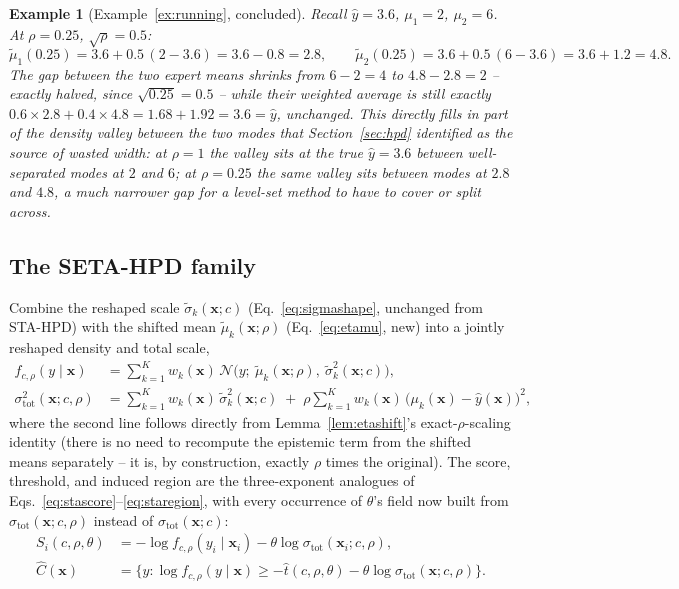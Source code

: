 \documentclass[11pt]{article}
\newtheorem{example}{Example}[section]
\begin{document}
\begin{example}[Example~\ref{ex:running}, concluded]
Recall $\hat y=3.6$, $\mu_1=2$, $\mu_2=6$. At $\rho=0.25$, $\sqrt\rho=0.5$:
\[
\tilde\mu_1(0.25) = 3.6 + 0.5\,(2-3.6) = 3.6 - 0.8 = 2.8, \qquad
\tilde\mu_2(0.25) = 3.6 + 0.5\,(6-3.6) = 3.6 + 1.2 = 4.8.
\]
The gap between the two expert means shrinks from $6-2=4$ to $4.8-2.8=2$ -- exactly halved, since
$\sqrt{0.25}=0.5$ -- while their weighted average is still exactly $0.6\times2.8+0.4\times4.8 =
1.68+1.92=3.6=\hat y$, unchanged. This directly fills in part of the density valley between the
two modes that Section~\ref{sec:hpd} identified as the source of wasted width: at $\rho=1$ the
valley sits at the true $\hat y=3.6$ between well-separated modes at $2$ and $6$; at $\rho=0.25$
the same valley sits between modes at $2.8$ and $4.8$, a much narrower gap for a level-set method
to have to cover or split across.
\end{example}

\subsection{The SETA-HPD family}

Combine the reshaped scale $\tilde\sigma_k(\bm x;c)$ (Eq.~\ref{eq:sigmashape}, unchanged from
STA-HPD) with the shifted mean $\tilde\mu_k(\bm x;\rho)$ (Eq.~\ref{eq:etamu}, new) into a jointly
reshaped density and total scale,
\begin{align}
f_{c,\rho}(y\mid\bm x) &= \sum_{k=1}^K w_k(\bm x)\,\mathcal N\big(y;\ \tilde\mu_k(\bm x;\rho),\
\tilde\sigma_k^2(\bm x;c)\big), \label{eq:fcrho}\\
\sigma_{\mathrm{tot}}^2(\bm x;c,\rho) &= \sum_{k=1}^K w_k(\bm x)\,\tilde\sigma_k^2(\bm x;c) \;+\;
\rho\sum_{k=1}^K w_k(\bm x)\,\big(\mu_k(\bm x)-\hat y(\bm x)\big)^2, \label{eq:sigmatotrho}
\end{align}
where the second line follows directly from Lemma~\ref{lem:etashift}'s exact-$\rho$-scaling
identity (there is no need to recompute the epistemic term from the shifted means separately -- it
is, by construction, exactly $\rho$ times the original). The score, threshold, and induced region
are the three-exponent analogues of Eqs.~\eqref{eq:stascore}--\eqref{eq:staregion}, with every
occurrence of $\theta$'s field now built from $\sigma_{\mathrm{tot}}(\bm x;c,\rho)$ instead of
$\sigma_{\mathrm{tot}}(\bm x;c)$:
\begin{align}
S_i(c,\rho,\theta) &= -\log f_{c,\rho}(y_i\mid\bm x_i) - \theta\log\sigma_{\mathrm{tot}}(\bm
x_i;c,\rho), \label{eq:setascore}\\
\hat C(\bm x) &= \Big\{y : \log f_{c,\rho}(y\mid\bm x) \ge -\hat t(c,\rho,\theta) -
\theta\log\sigma_{\mathrm{tot}}(\bm x;c,\rho)\Big\}. \label{eq:setaregion}
\end{align}
\end{document}
